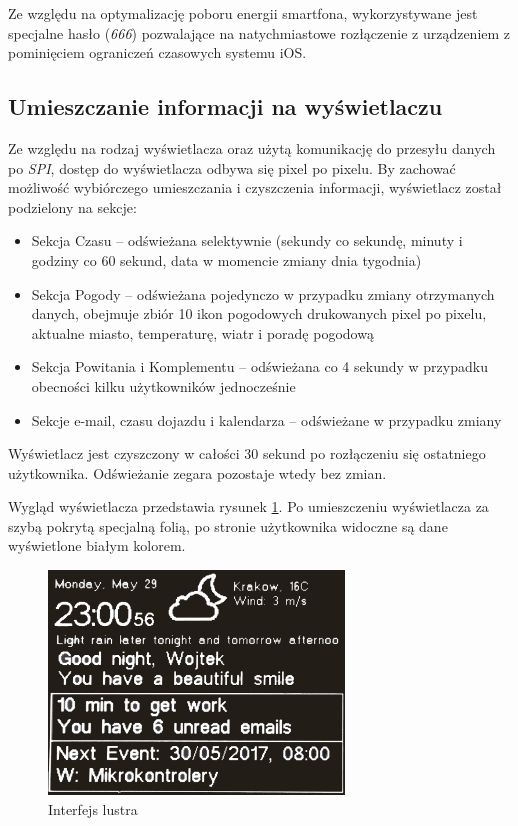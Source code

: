 \documentclass[a4paper,11pt]{article}
\begin{document}
Ze względu na optymalizację poboru energii smartfona, wykorzystywane jest specjalne hasło (\textit{666}) pozwalające na natychmiastowe rozłączenie z urządzeniem z pominięciem ograniczeń czasowych systemu iOS.

\subsection{Umieszczanie informacji na wyświetlaczu}
Ze względu na rodzaj wyświetlacza oraz użytą komunikację do przesyłu danych po \textit{SPI}, dostęp do wyświetlacza odbywa się pixel po pixelu. By zachować możliwość wybiórczego umieszczania i czyszczenia informacji, wyświetlacz został podzielony na sekcje:
\begin{itemize}
	\item Sekcja Czasu -- odświeżana selektywnie (sekundy co sekundę, minuty i godziny co 60 sekund, data w momencie zmiany dnia tygodnia)
	\item Sekcja Pogody -- odświeżana pojedynczo w przypadku zmiany otrzymanych danych, obejmuje zbiór 10 ikon pogodowych drukowanych pixel po pixelu, aktualne miasto, temperaturę, wiatr i poradę pogodową
	\item Sekcja Powitania i Komplementu -- odświeżana co 4 sekundy w przypadku obecności kilku użytkowników jednocześnie
	\item Sekcje e-mail, czasu dojazdu i kalendarza -- odświeżane w przypadku zmiany	
\end{itemize}

Wyświetlacz jest czyszczony w całości 30 sekund po rozłączeniu się ostatniego użytkownika. Odświeżanie zegara pozostaje wtedy bez zmian. 

Wygląd wyświetlacza przedstawia rysunek \ref{nrf_interface}. Po umieszczeniu wyświetlacza za szybą pokrytą specjalną folią, po stronie użytkownika widoczne są dane wyświetlone białym kolorem.

\begin{figure}[H]
	\includegraphics[width=0.7\textwidth,center]{nrf_interface}
	\caption {Interfejs lustra}
	\label{nrf_interface}
\end{figure}
\end{document}
